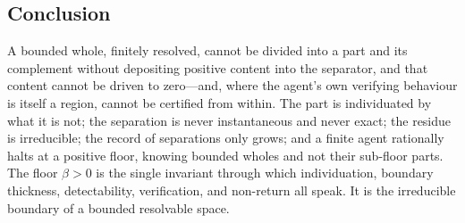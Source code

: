 \documentclass[11pt,twocolumn,a4paper]{article}
\theoremstyle{thmstyle}
\theoremstyle{definition}
\theoremstyle{remark}
\newcommand{\thick}{\beta}
\begin{document}
\subsection{Conclusion}

A bounded whole, finitely resolved, cannot be divided into a part and its
complement without depositing positive content into the separator, and that
content cannot be driven to zero---and, where the agent's own verifying behaviour
is itself a region, cannot be certified from within. The part is
individuated by what it is not; the separation is never instantaneous and never
exact; the residue is irreducible; the record of separations only grows; and a
finite agent rationally halts at a positive floor, knowing bounded wholes and not
their sub-floor parts. The floor $\thick>0$ is the single invariant through which
individuation, boundary thickness, detectability, verification, and non-return
all speak. It is the irreducible boundary of a bounded resolvable space.



\end{document}
